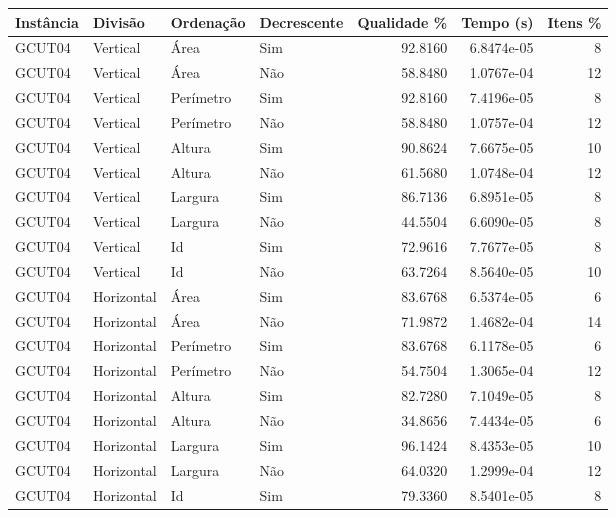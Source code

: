 \begin{tabular}{llllrrr}
\hline
Instância & Divisão     & Ordenação & Decrescente & Qualidade \% & Tempo (s)  & Itens \% \\
\hline
GCUT04    & Vertical    & Área      & Sim         & 92.8160      & 6.8474e-05 & 8        \\
GCUT04    & Vertical    & Área      & Não         & 58.8480      & 1.0767e-04 & 12       \\
GCUT04    & Vertical    & Perímetro & Sim         & 92.8160      & 7.4196e-05 & 8        \\
GCUT04    & Vertical    & Perímetro & Não         & 58.8480      & 1.0757e-04 & 12       \\
GCUT04    & Vertical    & Altura    & Sim         & 90.8624      & 7.6675e-05 & 10       \\
GCUT04    & Vertical    & Altura    & Não         & 61.5680      & 1.0748e-04 & 12       \\
GCUT04    & Vertical    & Largura   & Sim         & 86.7136      & 6.8951e-05 & 8        \\
GCUT04    & Vertical    & Largura   & Não         & 44.5504      & 6.6090e-05 & 8        \\
GCUT04    & Vertical    & Id        & Sim         & 72.9616      & 7.7677e-05 & 8        \\
GCUT04    & Vertical    & Id        & Não         & 63.7264      & 8.5640e-05 & 10       \\
GCUT04    & Horizontal  & Área      & Sim         & 83.6768      & 6.5374e-05 & 6        \\
GCUT04    & Horizontal  & Área      & Não         & 71.9872      & 1.4682e-04 & 14       \\
GCUT04    & Horizontal  & Perímetro & Sim         & 83.6768      & 6.1178e-05 & 6        \\
GCUT04    & Horizontal  & Perímetro & Não         & 54.7504      & 1.3065e-04 & 12       \\
GCUT04    & Horizontal  & Altura    & Sim         & 82.7280      & 7.1049e-05 & 8        \\
GCUT04    & Horizontal  & Altura    & Não         & 34.8656      & 7.4434e-05 & 6        \\
GCUT04    & Horizontal  & Largura   & Sim         & 96.1424      & 8.4353e-05 & 10       \\
GCUT04    & Horizontal  & Largura   & Não         & 64.0320      & 1.2999e-04 & 12       \\
GCUT04    & Horizontal  & Id        & Sim         & 79.3360      & 8.5401e-05 & 8        \\

\end{tabular}
